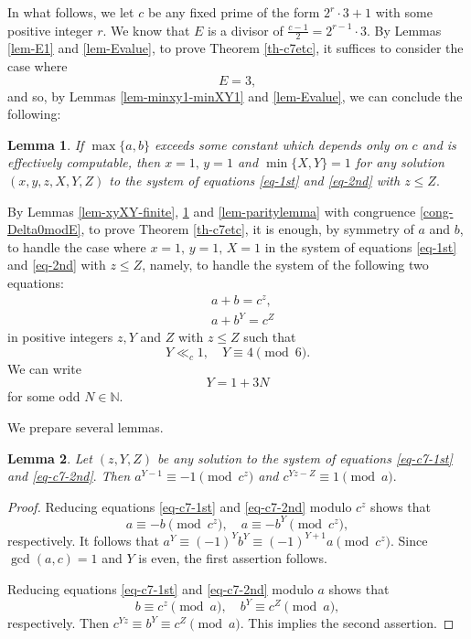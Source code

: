 \documentclass[11pt]{amsart}
\newtheorem{lem}{Lemma}[section]
\numberwithin{equation}{section}
\begin{document}
In what follows, we let $c$ be any fixed prime of the form $2^r \cdot 3+1$ with some positive integer $r$.
We know that $E$ is a divisor of $\frac{c-1}{2}=2^{r-1} \cdot 3$.
By Lemmas \ref{lem-E1} and \ref{lem-Evalue}, to prove Theorem \ref{th-c7etc}, it suffices to consider the case where 
\[
E=3, 
\]
and so, by Lemmas \ref{lem-minxy1-minXY1} and \ref{lem-Evalue}, we can conclude the following: 

\begin{lem}\label{lem-fromMP3Th3}
If $\max\{a,b\}$ exceeds some constant which depends only on $c$ and is effectively computable, then $x=1,\,y=1$ and $\min\{X,Y\}=1$ for any solution $(x,y,z,X,Y,Z)$ to the system of equations \eqref{eq-1st} and \eqref{eq-2nd} with $z \le Z.$
\end{lem}

By Lemmas \ref{lem-xyXY-finite}, \ref{lem-fromMP3Th3} and \ref{lem-paritylemma} with congruence \eqref{cong-Delta0modE}, to prove Theorem \ref{th-c7etc}, it is enough, by symmetry of $a$ and $b$, to handle the case where $x=1,\,y=1,\,X=1$ in the system of equations \eqref{eq-1st} and \eqref{eq-2nd} with $z \le Z$, namely, to handle the system of the following two equations:
\begin{eqnarray}
&a+b=c^z, \label{eq-c7-1st}\\
&a+b^Y=c^Z \label{eq-c7-2nd}
\end{eqnarray}
in positive integers $z,Y$ and $Z$ with $z \le Z$ such that 
\[
Y \ll_{c}1, \quad Y \equiv 4 \pmod{6}.
\]
We can write 
\[
Y=1+3N
\]
for some odd $N \in \mathbb N$.

We prepare several lemmas.

\begin{lem}\label{c7etc-lem-cong}
Let $(z,Y,Z)$ be any solution to the system of equations \eqref{eq-c7-1st} and \eqref{eq-c7-2nd}$.$
Then $a^{Y-1} \equiv -1 \pmod{c^z}$ and $c^{Y z-Z} \equiv 1 \pmod{a}.$
\end{lem}

\begin{proof}
Reducing equations \eqref{eq-c7-1st} and \eqref{eq-c7-2nd} modulo $c^z$ shows that
\[
a \equiv -b \pmod{c^z}, \quad a \equiv - b^Y \pmod{c^z},
\]
respectively.
It follows that $a^Y \equiv (-1)^Y b^Y \equiv (-1)^{Y+1} a \pmod{c^z}$.
Since $\gcd(a,c)=1$ and $Y$ is even, the first assertion follows.

Reducing equations \eqref{eq-c7-1st} and \eqref{eq-c7-2nd} modulo $a$ shows that
\[
b \equiv c^z \pmod{a}, \quad b^Y \equiv c^Z \pmod{a},
\]
respectively.
Then $c^{Y z} \equiv b^Y \equiv c^Z \pmod{a}$.
This implies the second assertion.
\end{proof}
\end{document}

